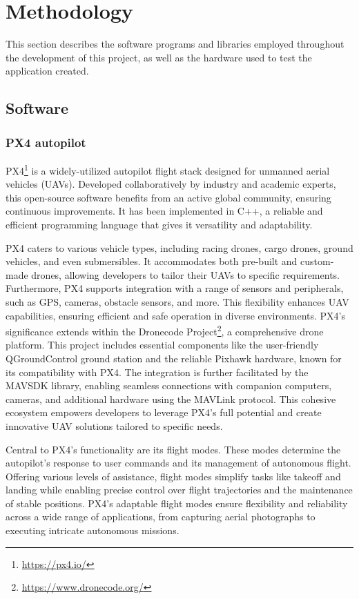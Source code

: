 \section{Methodology}

This section describes the software programs and libraries employed throughout the development of this project, as well as the hardware used to test the application created.

\subsection{Software}

\subsubsection{PX4 autopilot}
\label{subsec:px4}

PX4\footnote{\url{https://px4.io/}} is a widely-utilized autopilot flight stack designed for unmanned aerial vehicles (UAVs). Developed collaboratively by industry and academic experts, this open-source software benefits from an active global community, ensuring continuous improvements. It has been implemented in C++, a reliable and efficient programming language that gives it versatility and adaptability.

PX4 caters to various vehicle types, including racing drones, cargo drones, ground vehicles, and even submersibles. It accommodates both pre-built and custom-made drones, allowing developers to tailor their UAVs to specific requirements. Furthermore, PX4 supports integration with a range of sensors and peripherals, such as GPS, cameras, obstacle sensors, and more. This flexibility enhances UAV capabilities, ensuring efficient and safe operation in diverse environments.
PX4's significance extends within the Dronecode Project\footnote{\url{https://www.dronecode.org/}}, a comprehensive drone platform. This project includes essential components like the user-friendly QGroundControl ground station and the reliable Pixhawk hardware, known for its compatibility with PX4. The integration is further facilitated by the MAVSDK library, enabling seamless connections with companion computers, cameras, and additional hardware using the MAVLink protocol. This cohesive ecosystem empowers developers to leverage PX4's full potential and create innovative UAV solutions tailored to specific needs.

Central to PX4's functionality are its flight modes. These modes determine the autopilot's response to user commands and its management of autonomous flight. Offering various levels of assistance, flight modes simplify tasks like takeoff and landing while enabling precise control over flight trajectories and the maintenance of stable positions. PX4's adaptable flight modes ensure flexibility and reliability across a wide range of applications, from capturing aerial photographs to executing intricate autonomous missions.

